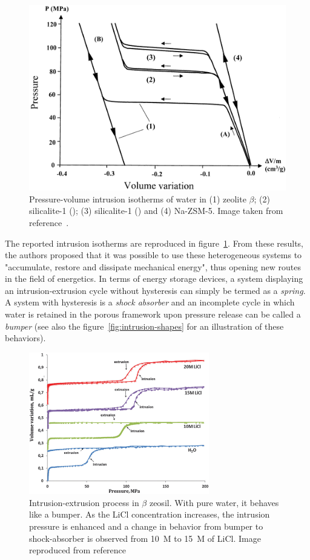 \documentclass[thesis]{subfiles}
\begin{document}
\begin{figure}[ht]
    \centering
    \includegraphics[width=0.75\linewidth]{figures/cited/intrusion-zeosil}
    \caption{Pressure-volume intrusion isotherms of water in (1) zeolite
    $\beta$; (2) silicalite-1 (); (3) silicalite-1 () and (4)
    Na-ZSM-5. Image taken from reference~\cite{Eroshenko2001}.}
    \label{fig:intrusion-zeosil}
\end{figure}

The reported intrusion isotherms are reproduced in
figure~\ref{fig:intrusion-zeosil}. From these results, the authors proposed that
it was possible to use these heterogeneous systems to "accumulate, restore and
dissipate mechanical energy", thus opening new routes in the field of
energetics. In terms of energy storage devices, a system displaying an
intrusion-extrusion cycle without hysteresis can simply be termed as a
\emph{spring}. A system with hysteresis is a \emph{shock absorber} and an
incomplete cycle in which water is retained in the porous framework upon
pressure release can be called a \emph{bumper} (see also the
figure~\ref{fig:intrusion-shapes} for an illustration of these behaviors).

\begin{figure}[p]
    \centering
    \includegraphics[width=0.7\textwidth]{figures/cited/intrusion-licl}
    \caption{Intrusion-extrusion process in $\beta$ zeosil. With pure water, it
    behaves like a bumper. As the LiCl concentration increases, the intrusion
    pressure is enhanced and a change in behavior from bumper to shock-absorber
    is observed from 10~M to 15~M of LiCl. Image reproduced from
    reference~\cite{Ryzhikov2014}}
    \label{fig:intrusion-licl}
\end{figure}
\end{document}
